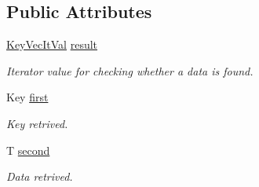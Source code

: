 \subsection*{Public Attributes}
\begin{DoxyCompactItemize}
\item 
\mbox{\label{classilang_1_1_key_vec_it_a465bc3a4924f6a7bab71a18b2d998f7a}} 
\mbox{\hyperlink{namespaceilang_aeb374202f0c669bea0a49b87d8dee143}{Key\+Vec\+It\+Val}} \mbox{\hyperlink{classilang_1_1_key_vec_it_a465bc3a4924f6a7bab71a18b2d998f7a}{result}}
\begin{DoxyCompactList}\small\item\em Iterator value for checking whether a data is found. \end{DoxyCompactList}\item 
\mbox{\label{classilang_1_1_key_vec_it_a2771cebc1c4e334a400e2848fd798786}} 
Key \mbox{\hyperlink{classilang_1_1_key_vec_it_a2771cebc1c4e334a400e2848fd798786}{first}}
\begin{DoxyCompactList}\small\item\em Key retrived. \end{DoxyCompactList}\item 
\mbox{\label{classilang_1_1_key_vec_it_a0ce2ee174229296f5abf0e838f4029b0}} 
T \mbox{\hyperlink{classilang_1_1_key_vec_it_a0ce2ee174229296f5abf0e838f4029b0}{second}}
\begin{DoxyCompactList}\small\item\em Data retrived. \end{DoxyCompactList}\end{DoxyCompactItemize}
